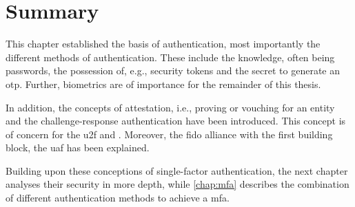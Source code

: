 \newpage
\section{Summary}

This chapter established the basis of authentication, most importantly the different methods of authentication. These include the knowledge, often being passwords, the possession of, e.g., security tokens and the secret to generate an \gls{otp}. Further, biometrics are of importance for the remainder of this thesis.

In addition, the concepts of attestation, i.e., proving or vouching for an entity and the challenge-response authentication have been introduced. This concept is of concern for the \gls{u2f} and \wa. Moreover, the \gls{fido} alliance with the first building block, the \gls{uaf} has been explained.

Building upon these conceptions of single-factor authentication, the next chapter analyses their security in more depth, while \autoref{chap:mfa} describes the combination of different authentication methods to achieve a \gls{mfa}.